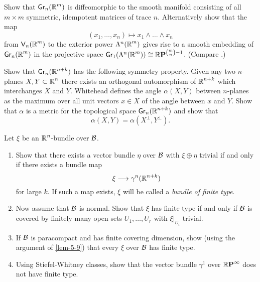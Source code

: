 \begin{problem}\label{prob-5-C}
	Show that $\grass{n}{m}$ is diffeomorphic to the smooth 
	manifold consisting of all $m \times m$ symmetric, idempotent matrices of trace $n$.
	Alternatively show that the map
	\[(x_1,\dots,x_n)\longmapsto x_1\wedge\dots\wedge x_n\]
	from $\stiefel{n}{}{m}$ to the exterior power $\Lambda^n(\boldsymbol{\mathbb{R}}^m)$ gives rise to a smooth 
	embedding of $\grass{n}{m}$ in the projective space $\mathsf{Gr}_1(\Lambda^n(\boldsymbol{\mathbb{R}}^m))\cong\boldsymbol{\mathbb{R}}\boldsymbol{\mathrm{P}}^{\binom{m}{n}-1}$. 
	(Compare \cite[\S~7]{81}.)
\end{problem}
\begin{problem}\label{prob-5-D}
	Show that $\grass{n}{n+k}$ has the following symmetry 
	property. Given any two $n$-planes $X, Y \subset \boldsymbol{\mathbb{R}}^n$ there exists an orthogonal
	automorphism of $\boldsymbol{\mathbb{R}}^{n+k}$ which interchanges $X$ and $Y$. Whitehead \cite{82}
	defines the angle $\alpha(X, Y)$ between $n$-planes as the maximum over all unit
	vectors $x\in X$ of the angle between $x$ and $Y$. Show that $\alpha$ is a metric
	for the topological space $\grass{n}{n+k}$ and show that
	\[\alpha(X, Y)=\alpha(X^\perp, Y^\perp).\]
\end{problem}
\begin{problem}\label{prob-5-E}
	Let $\xi$ be an $\boldsymbol{\mathbb{R}}^n$-bundle over $\mathcal{B} $.
	\begin{enumerate}[label=\arabic*),leftmargin=2\parindent ]
		\item Show that there exists a vector bundle $\eta$ over $\mathcal{B} $ with $\xi\oplus\eta$
		trivial if and only if there exists a bundle map
		\[\xi\longrightarrow\gamma^n(\boldsymbol{\mathbb{R}}^{n+k})\]
		for large $k$. If such a map exists, $\xi$ will be called a \textit{bundle of
		finite type}.
		\item Now assume that $\mathcal{B} $ is normal. Show that $\xi$ has finite type if
		and only if $\mathcal{B} $ is covered by finitely many open sets $U_1,\dots,
		U_r$
		with $\xi|_{U_i}$ trivial.
		\item If $\mathcal{B} $ is paracompact and has finite covering dimension, show
		(using the argument of \cref{lem-5-9}) that every $\xi$ over $\mathcal{B} $ has finite type.
		\item Using Stiefel-Whitney classes, show that the vector bundle $\gamma^1$
		over $\boldsymbol{\mathbb{R}}\boldsymbol{\mathrm{P}}^{\infty}$ does not have finite type.
	\end{enumerate}
\end{problem}